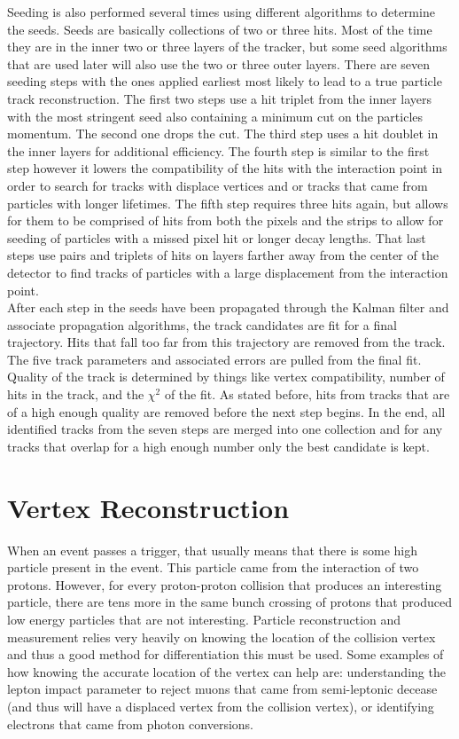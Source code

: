 	Seeding is also performed several times using different algorithms to determine the seeds. Seeds are basically collections of two or three hits. Most of the time they are in the inner two or three layers of the tracker, but some seed algorithms that are used later will also use the two or three outer layers. There are seven seeding steps with the ones applied earliest most likely to lead to a true particle track reconstruction. The first two steps use a hit triplet from the inner layers with the most stringent seed also containing a minimum \pt cut on the particles momentum. The second one drops the \pt cut. The third step uses a hit doublet in the inner layers for additional efficiency. The fourth step is similar to the first step however it lowers the compatibility of the hits with the interaction point in order to search for tracks with displace vertices and or tracks that came from particles with longer lifetimes. The fifth step requires three hits again, but allows for them to be comprised of hits from both the pixels and the strips to allow for seeding of particles with a missed pixel hit or longer decay lengths. That last steps use pairs and triplets of hits on layers farther away from the center of the detector to find tracks of particles with a large displacement from the interaction point.\\
	
	After each step in the seeds have been propagated through the Kalman filter and associate propagation algorithms, the track candidates are fit for a final trajectory. Hits that fall too far from this trajectory are removed from the track. The five track parameters and associated errors are pulled from the final fit. Quality of the track is determined by things like vertex compatibility, number of hits in the track, and the $\chi ^2$ of the fit. As stated before, hits from tracks that are of a high enough quality are removed before the next step begins. In the end, all identified tracks from the seven steps are merged into one collection and for any tracks that overlap for a high enough number only the best candidate is kept.\\
	
		
	\section{Vertex Reconstruction}
	When an event passes a trigger, that usually means that there is some high \pt particle present in the event. This particle came from the interaction of two protons. However, for every proton-proton collision that produces an interesting particle, there are tens more in the same bunch crossing of protons that produced low energy particles that are not interesting. Particle reconstruction and measurement relies very heavily on knowing the location of the collision vertex and thus a good method for differentiation this must be used. Some examples of how knowing the accurate location of the vertex can help are: understanding the lepton impact parameter to reject muons that came from semi-leptonic decease (and thus will have a displaced vertex from the collision vertex), or identifying electrons that came from photon conversions.\\
	

